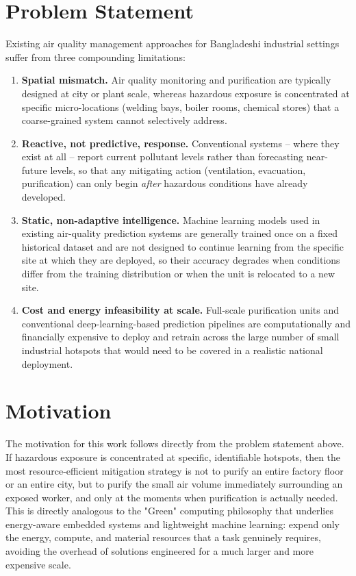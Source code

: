 
\section{Problem Statement}
\label{sec:problem-statement}

Existing air quality management approaches for Bangladeshi industrial settings suffer from three compounding limitations:

\begin{enumerate}[label=(\roman*)]
    \item \textbf{Spatial mismatch.} Air quality monitoring and purification are typically designed at city or plant scale, whereas hazardous exposure is concentrated at specific micro-locations (welding bays, boiler rooms, chemical stores) that a coarse-grained system cannot selectively address.
    \item \textbf{Reactive, not predictive, response.} Conventional systems -- where they exist at all -- report current pollutant levels rather than forecasting near-future levels, so that any mitigating action (ventilation, evacuation, purification) can only begin \emph{after} hazardous conditions have already developed.
    \item \textbf{Static, non-adaptive intelligence.} Machine learning models used in existing air-quality prediction systems are generally trained once on a fixed historical dataset and are not designed to continue learning from the specific site at which they are deployed, so their accuracy degrades when conditions differ from the training distribution or when the unit is relocated to a new site.
    \item \textbf{Cost and energy infeasibility at scale.} Full-scale purification units and conventional deep-learning-based prediction pipelines are computationally and financially expensive to deploy and retrain across the large number of small industrial hotspots that would need to be covered in a realistic national deployment.
\end{enumerate}

\section{Motivation}
\label{sec:motivation}

The motivation for this work follows directly from the problem statement above. If hazardous exposure is concentrated at specific, identifiable hotspots, then the most resource-efficient mitigation strategy is not to purify an entire factory floor or an entire city, but to purify the small air volume immediately surrounding an exposed worker, and only at the moments when purification is actually needed. This is directly analogous to the "Green" computing philosophy that underlies energy-aware embedded systems and lightweight machine learning: expend only the energy, compute, and material resources that a task genuinely requires, avoiding the overhead of solutions engineered for a much larger and more expensive scale.

